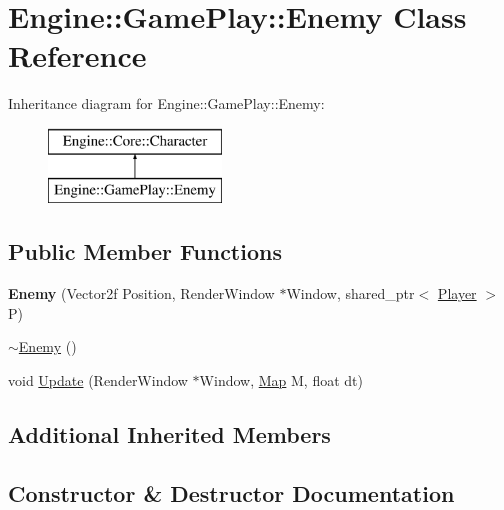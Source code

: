 \hypertarget{class_engine_1_1_game_play_1_1_enemy}{}\section{Engine\+:\+:Game\+Play\+:\+:Enemy Class Reference}
\label{class_engine_1_1_game_play_1_1_enemy}
Inheritance diagram for Engine\+:\+:Game\+Play\+:\+:Enemy\+:\begin{figure}[H]
\begin{center}
\leavevmode
\includegraphics[height=2.000000cm]{class_engine_1_1_game_play_1_1_enemy}
\end{center}
\end{figure}
\subsection*{Public Member Functions}
\begin{DoxyCompactItemize}
\item 
\mbox{\label{class_engine_1_1_game_play_1_1_enemy_aaae645c4e486d9595a0aef7964c252a3}} 
{\bfseries Enemy} (Vector2f Position, Render\+Window $\ast$Window, shared\+\_\+ptr$<$ \hyperlink{class_engine_1_1_game_play_1_1_player}{Player} $>$ P)
\item 
\hyperlink{class_engine_1_1_game_play_1_1_enemy_a4fc3aafb331e8cf852ea31bcc63940ff}{$\sim$\+Enemy} ()
\item 
void \hyperlink{class_engine_1_1_game_play_1_1_enemy_abc8825ecfc278a6308e8e8bd523cb03f}{Update} (Render\+Window $\ast$Window, \hyperlink{class_engine_1_1_core_1_1_map}{Map} M, float dt)
\end{DoxyCompactItemize}
\subsection*{Additional Inherited Members}


\subsection{Constructor \& Destructor Documentation}
\mbox{\label{class_engine_1_1_game_play_1_1_enemy_a4fc3aafb331e8cf852ea31bcc63940ff}} 
